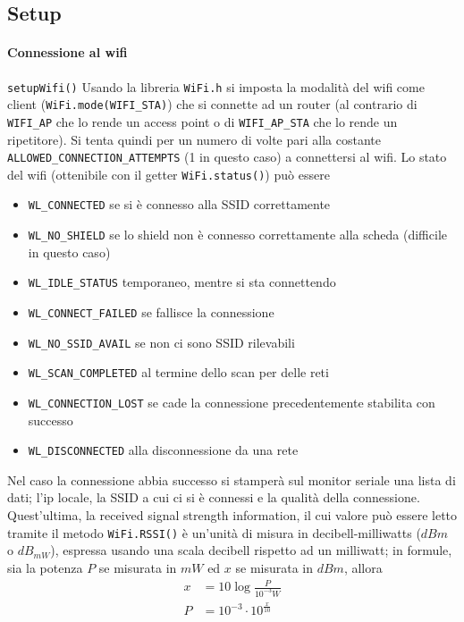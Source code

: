 \documentclass{article}
\begin{document}
    \subsection{Setup}

    \paragraph{Connessione al wifi} \texttt{setupWifi()}
    Usando la libreria \texttt{WiFi.h} si imposta la modalità del wifi come client (\texttt{WiFi.mode(WIFI\_STA)}) che si connette ad un router (al contrario di \texttt{WIFI\_AP} che lo rende un access point o di \texttt{WIFI\_AP\_STA} che lo rende un ripetitore). Si tenta quindi per un numero di volte pari alla costante \texttt{ALLOWED\_CONNECTION\_ATTEMPTS} (1 in questo caso) a connettersi al wifi. Lo stato del wifi (ottenibile con il getter \texttt{WiFi.status()}) può essere
    \begin{itemize}
        \item \texttt{WL\_CONNECTED} se si è connesso alla SSID correttamente 
        \item \texttt{WL\_NO\_SHIELD} se lo shield non è connesso correttamente alla scheda (difficile in questo caso) 
        \item \texttt{WL\_IDLE\_STATUS} temporaneo, mentre si sta connettendo 
        \item \texttt{WL\_CONNECT\_FAILED} se fallisce la connessione
        \item \texttt{WL\_NO\_SSID\_AVAIL} se non ci sono SSID rilevabili  
        \item \texttt{WL\_SCAN\_COMPLETED} al termine dello scan per delle reti  
        \item \texttt{WL\_CONNECTION\_LOST} se cade la connessione precedentemente stabilita con successo  
        \item \texttt{WL\_DISCONNECTED} alla disconnessione da una rete 
    \end{itemize}
    Nel caso la connessione abbia successo si stamperà sul monitor seriale una lista di dati; l'ip locale, la SSID a cui ci si è connessi e la qualità della connessione. Quest'ultima, la received signal strength information, il cui valore può essere letto tramite il metodo \texttt{WiFi.RSSI()} è un'unità di misura in decibell-milliwatts ($dBm$ o $dB_{mW}$), espressa usando una scala decibell rispetto ad un milliwatt; in formule, sia la potenza $P$ se misurata in $mW$ ed $x$ se misurata in $dBm$, allora
    \begin{align*}
        x & = 10 \log{\frac{P}{10^{-3}W}} \\
        P & = 10^{-3} \cdot 10^{\frac{x}{10}} \\
    \end{align*}
\end{document}
